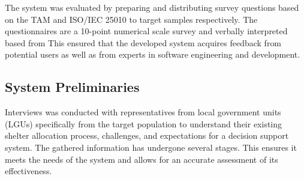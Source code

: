\documentclass[11pt,letterpaper,]{article}
\begin{document}
	The system was evaluated by preparing and distributing survey questions based on the TAM and ISO/IEC 25010 to target samples respectively. The questionnaires are a 10-point numerical scale survey and verbally interpreted based from \textcite{Eladia2024} This ensured that the developed system acquires feedback from potential users as well as from experts in software engineering and development.
	
	\subsection{System Preliminaries}
	
	Interviews was conducted with representatives from local government units (LGUs) specifically from the target population to understand their existing shelter allocation process, challenges, and expectations for a decision support system. The gathered information has undergone several stages. This ensures it meets the needs of the system and allows for an accurate assessment of its effectiveness.
	
\end{document}
